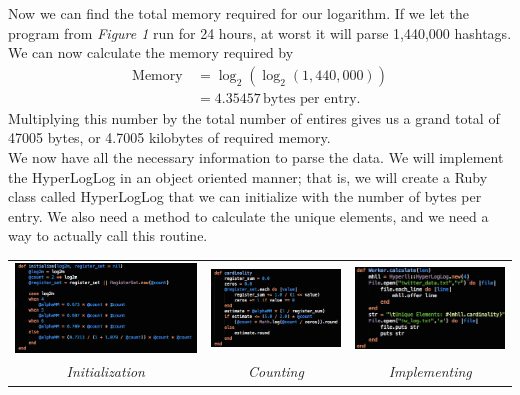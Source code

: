 \documentclass{article}
\begin{document}
Now we can find the total memory required for our logarithm. If we let the program from \textit{Figure 1} run for 24 hours, at worst it will parse 1,440,000 hashtags.
We can now calculate the memory required by
\begin{align*}
\text{Memory}\, &= \log_{2}{(\log_{2}{(1,440,000)})}\\
&= 4.35457 \, \text{bytes per entry}.
\end{align*}
Multiplying this number by the total number of entires gives us a grand total of 47005 bytes, or 4.7005 kilobytes of required memory.\\
\indent We now have all the necessary information to parse the data. We will implement the HyperLogLog in an object oriented manner; that is, we will create a Ruby class called HyperLogLog that we can initialize with the number of bytes per entry.
We also need a method to calculate the unique elements, and we need a way to actually call this routine.
\begin{center}
\begin{tabular}{c c c}
\includegraphics[scale=0.3]{twitter_problem/hll_init}
&
\includegraphics[scale=0.4]{twitter_problem/hll_count}
&
\includegraphics[scale=0.4]{twitter_problem/hll_imp}
\\
\textit{Initialization} & \textit{Counting} & \textit{Implementing}
\end{tabular}
\end{center}
\end{document}
